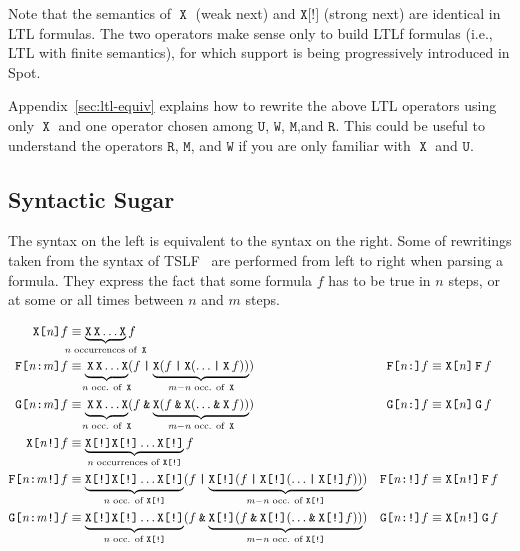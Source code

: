 \documentclass[a4paper,twoside,10pt,DIV=12]{scrreprt}
\DeclareMathOperator{\F}{\texttt{F}}
\newcommand{\FREP}[1]{\texttt{F[#1]}}
\newcommand{\StrongFREP}[1]{\texttt{F[#1!]}}
\DeclareMathOperator{\G}{\texttt{G}}
\newcommand{\GREP}[1]{\texttt{G[#1]}}
\newcommand{\StrongGREP}[1]{\texttt{G[#1!]}}
\newcommand{\U}{\mathbin{\texttt{U}}}
\newcommand{\R}{\mathbin{\texttt{R}}}
\DeclareMathOperator{\X}{\texttt{X}}
\newcommand{\StrongX}{\texttt{X[!]}}
\newcommand{\XREP}[1]{\texttt{X[#1]}}
\newcommand{\StrongXREP}[1]{\texttt{X[#1!]}}
\newcommand{\M}{\mathbin{\texttt{M}}}
\newcommand{\W}{\mathbin{\texttt{W}}}
\newcommand{\OR}{\mathbin{\texttt{|}}}
\newcommand{\AND}{\mathbin{\texttt{\&}}}
\newcommand{\0}{\texttt{0}}
\newcommand{\1}{\texttt{1}}
\def\clap#1{\hbox to 0pt{\hss#1\hss}}
\def\mathclap{\mathpalette\mathclapinternal}
\def\mathclapinternal#1#2{%
           \clap{$\mathsurround=0pt#1{#2}$}}
\newcommand\mvar[1]{\ensuremath{\mathit{#1}}}
\begin{document}
Note that the semantics of $\X$ (weak next) and $\StrongX$ (strong
next) are identical in LTL formulas.  The two operators make sense
only to build LTLf formulas (i.e., LTL with finite semantics), for
which support is being progressively introduced in Spot.

Appendix~\ref{sec:ltl-equiv} explains how to rewrite the above LTL
operators using only $\X$ and one operator chosen among $\U$, $\W$,
$\M$,and $\R$.  This could be useful to understand the operators $\R$,
$\M$, and $\W$ if you are only familiar with $\X$ and $\U$.

\subsection{Syntactic Sugar}

The syntax on the left is equivalent to the syntax on the right.
Some of rewritings taken from the syntax of TSLF~\citep{jacobs.16.synt}
are performed from left to right when parsing a formula.  They express
the fact that some formula $f$ has to be true in $n$ steps, or at some
or all times between $n$ and $m$ steps.

\begin{align*}
  \XREP{\mvar{n}} f
  & \equiv \underbrace{\X\X\ldots\X}_{\mathclap{\text{\mvar{n} occurrences of~}\X}} f \\
  \FREP{\mvar{n}:\mvar{m}}f
  & \equiv \underbrace{\vphantom{(}\X\X\ldots\X}_{\mathclap{\text{\mvar{n} occ. of~}\X}} (f \OR \underbrace{\X(f \OR \X(\ldots \OR \X f))}_{\mathclap{\mvar{m}-\mvar{n}\text{~occ. of~}\X}})
  & \FREP{\mvar{n}:}f &\equiv \XREP{\mvar{n}}\F{}f\\
  \GREP{\mvar{n}:\mvar{m}}f
  & \equiv \underbrace{\vphantom{(}\X\X\ldots\X}_{\mathclap{\text{\mvar{n} occ. of~}\X}} (f \AND \underbrace{\X(f \AND \X(\ldots \AND \X f))}_{\mathclap{\mvar{m}-\mvar{n}\text{~occ. of~}\X}})
  & \GREP{\mvar{n}:}f &\equiv \XREP{\mvar{n}}\G{}f\\
 \StrongXREP{\mvar{n}} f
 & \equiv \underbrace{\StrongX\StrongX\ldots\StrongX}_{\mathclap{\text{\mvar{n} occurrences of~}\StrongX}} f \\
 \StrongFREP{\mvar{n}:\mvar{m}}f
 & \equiv \underbrace{\vphantom{(}\StrongX\StrongX\ldots\StrongX}_{\mathclap{\text{\mvar{n} occ. of~}\StrongX}} (f \OR \underbrace{\StrongX(f \OR \StrongX(\ldots \OR \StrongX f))}_{\mathclap{\mvar{m}-\mvar{n}\text{~occ. of~}\StrongX}})
 & \StrongFREP{\mvar{n}:}f &\equiv \StrongXREP{\mvar{n}}\F{}f\\
 \StrongGREP{\mvar{n}:\mvar{m}}f
 & \equiv \underbrace{\vphantom{(}\StrongX\StrongX\ldots\StrongX}_{\mathclap{\text{\mvar{n} occ. of~}\StrongX}} (f \AND \underbrace{\StrongX(f \AND \StrongX(\ldots \AND \StrongX f))}_{\mathclap{\mvar{m}-\mvar{n}\text{~occ. of~}\StrongX}})
 & \StrongGREP{\mvar{n}:}f &\equiv \StrongXREP{\mvar{n}}\G{}f
\end{align*}
\end{document}
